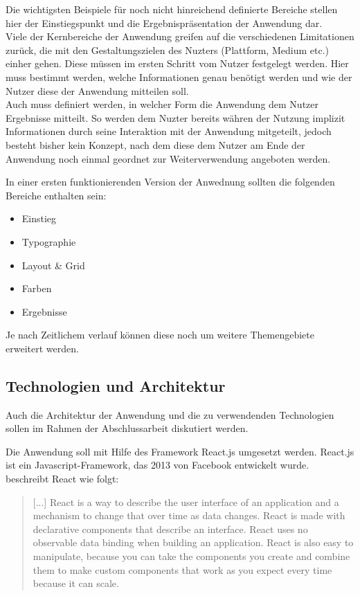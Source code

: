 Die wichtigsten Beispiele für noch nicht hinreichend definierte Bereiche stellen hier der Einstiegspunkt und die Ergebnispräsentation der Anwendung dar.\\
Viele der Kernbereiche der Anwendung greifen auf die verschiedenen Limitationen zurück, die mit den Gestaltungszielen des Nuzters (Plattform, Medium etc.) einher gehen. Diese müssen im ersten Schritt vom Nutzer festgelegt werden. Hier muss bestimmt werden, welche Informationen genau benötigt werden und wie der Nutzer diese der Anwendung mitteilen soll.\\
Auch muss definiert werden, in welcher Form die Anwendung dem Nutzer Ergebnisse mitteilt. So werden dem Nuzter bereits währen der Nutzung implizit Informationen durch seine Interaktion mit der Anwendung mitgeteilt, jedoch besteht bisher kein Konzept, nach dem diese dem Nutzer am Ende der Anwendung noch einmal geordnet zur Weiterverwendung angeboten werden.

In einer ersten funktionierenden Version der Anwednung sollten die folgenden Bereiche enthalten sein:

\begin{itemize}
  \item Einstieg
  \item Typographie
  \item Layout \& Grid
  \item Farben
  \item Ergebnisse
\end{itemize}

Je nach Zeitlichem verlauf können diese noch um weitere Themengebiete erweitert werden.

\subsection{Technologien und Architektur}
Auch die Architektur der Anwendung und die zu verwendenden Technologien sollen im Rahmen der Abschlussarbeit diskutiert werden.

Die Anwendung soll mit Hilfe des Framework React.js umgesetzt werden. React.js ist ein Javascript-Framework, das 2013 von Facebook entwickelt wurde. \cite{gackenheimer2015react} beschreibt React wie folgt:

\begin{quote}
[...] React is a way to describe the user interface of an application and a mechanism to change that over time as data changes. React is made with declarative components that describe an interface. React uses no observable data binding when building an application. React is also easy to manipulate, because you can take the components you create and combine them to make custom components that work as you expect every time because it can scale.
\end{quote}

